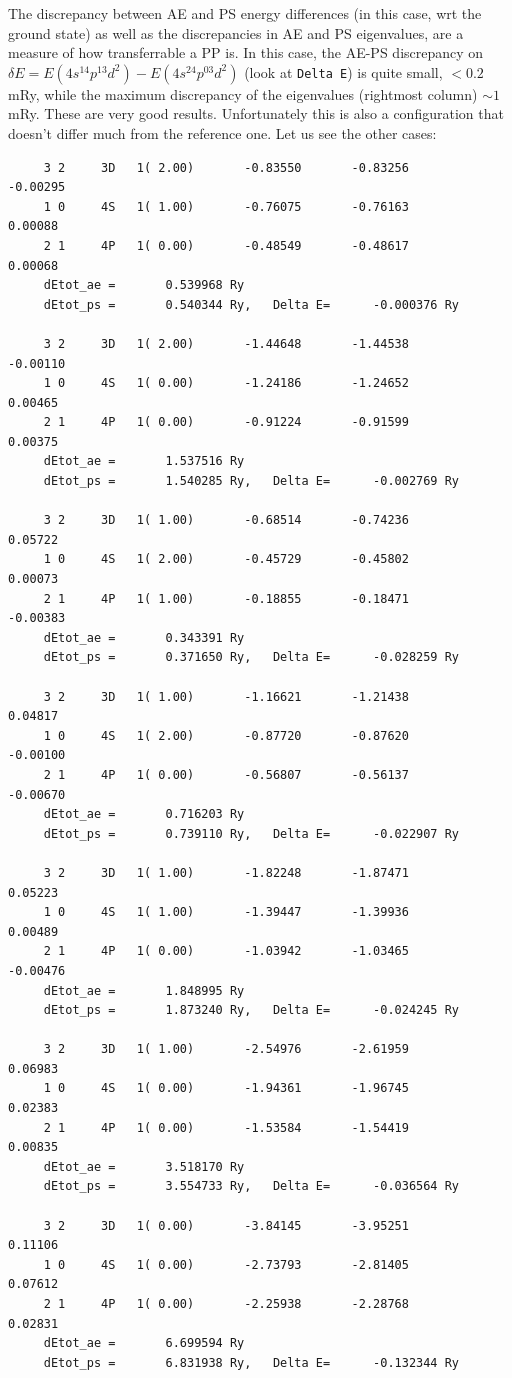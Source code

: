 \documentclass[12pt,a4paper]{article}
\begin{document}
The discrepancy between AE and PS energy differences (in this case,
wrt the ground state) as well as the discrepancies in AE and PS 
eigenvalues, are a measure of how transferrable a PP is. In this case,
the AE-PS discrepancy on $\delta E = E(4s^14p^13d^2) - E(4s^24p^03d^2)$
(look at \texttt{Delta E}) is quite small, $<0.2$ mRy, while the 
maximum discrepancy of the eigenvalues (rightmost column) $\sim 1$ mRy. 
These are very good results.
Unfortunately this is also a configuration that doesn't differ much
from the reference one. Let us see the other cases:
\begin{verbatim}
     3 2     3D   1( 2.00)       -0.83550       -0.83256       -0.00295
     1 0     4S   1( 1.00)       -0.76075       -0.76163        0.00088
     2 1     4P   1( 0.00)       -0.48549       -0.48617        0.00068
     dEtot_ae =       0.539968 Ry
     dEtot_ps =       0.540344 Ry,   Delta E=      -0.000376 Ry
 
     3 2     3D   1( 2.00)       -1.44648       -1.44538       -0.00110
     1 0     4S   1( 0.00)       -1.24186       -1.24652        0.00465
     2 1     4P   1( 0.00)       -0.91224       -0.91599        0.00375
     dEtot_ae =       1.537516 Ry
     dEtot_ps =       1.540285 Ry,   Delta E=      -0.002769 Ry
 
     3 2     3D   1( 1.00)       -0.68514       -0.74236        0.05722
     1 0     4S   1( 2.00)       -0.45729       -0.45802        0.00073
     2 1     4P   1( 1.00)       -0.18855       -0.18471       -0.00383
     dEtot_ae =       0.343391 Ry
     dEtot_ps =       0.371650 Ry,   Delta E=      -0.028259 Ry
 
     3 2     3D   1( 1.00)       -1.16621       -1.21438        0.04817
     1 0     4S   1( 2.00)       -0.87720       -0.87620       -0.00100
     2 1     4P   1( 0.00)       -0.56807       -0.56137       -0.00670
     dEtot_ae =       0.716203 Ry
     dEtot_ps =       0.739110 Ry,   Delta E=      -0.022907 Ry
 
     3 2     3D   1( 1.00)       -1.82248       -1.87471        0.05223
     1 0     4S   1( 1.00)       -1.39447       -1.39936        0.00489
     2 1     4P   1( 0.00)       -1.03942       -1.03465       -0.00476
     dEtot_ae =       1.848995 Ry
     dEtot_ps =       1.873240 Ry,   Delta E=      -0.024245 Ry
 
     3 2     3D   1( 1.00)       -2.54976       -2.61959        0.06983
     1 0     4S   1( 0.00)       -1.94361       -1.96745        0.02383
     2 1     4P   1( 0.00)       -1.53584       -1.54419        0.00835
     dEtot_ae =       3.518170 Ry
     dEtot_ps =       3.554733 Ry,   Delta E=      -0.036564 Ry
 
     3 2     3D   1( 0.00)       -3.84145       -3.95251        0.11106
     1 0     4S   1( 0.00)       -2.73793       -2.81405        0.07612
     2 1     4P   1( 0.00)       -2.25938       -2.28768        0.02831
     dEtot_ae =       6.699594 Ry
     dEtot_ps =       6.831938 Ry,   Delta E=      -0.132344 Ry
\end{verbatim} 
\end{document}
